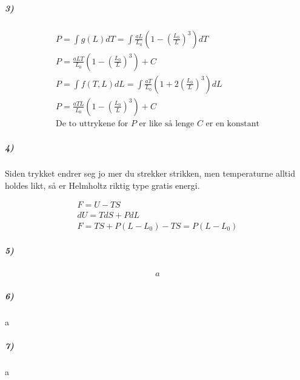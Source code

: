 \documentclass[11pt, A4paper, norsk]{article}
\begin{document}
			\subparagraph{3)}
				\begin{gather*}
P = \int g(L) dT = \int \frac{a L}{L_0} \left( 1 - \left( \frac{L_0}{L} \right)^3 \right) dT \\
P = \frac{a L T}{L_0} \left( 1 - \left( \frac{L_0}{L} \right)^3 \right) + C \\
P = \int f(T, L) dL = \int \frac{a T}{L_0} \left( 1 + 2 \left( \frac{L_0}{L} \right)^3 \right) dL \\
P = \frac{a T L}{L_0} \left( 1 - \left( \frac{L_0}{L} \right)^3 \right) + C \\
\text{De to uttrykene for $P$ er like så lenge $C$ er en konstant}
				\end{gather*}

			









			\subparagraph{4)}
				\begin{flushleft}
Siden trykket endrer seg jo mer du strekker strikken, men temperaturne alltid holdes likt, så er Helmholtz riktig type gratis energi.
				\end{flushleft}
				\begin{gather*}
F = U - TS \\
dU = T dS + P dL \\
F = T S + P (L - L_0) - T S = P (L - L_0)
				\end{gather*}









			\subparagraph{5)}
				\begin{gather*}
a
				\end{gather*}










			\subparagraph{6)}
				\begin{flushleft}
a
				\end{flushleft}









			\subparagraph{7)}
				\begin{flushleft}
a
				\end{flushleft}
\end{document}

